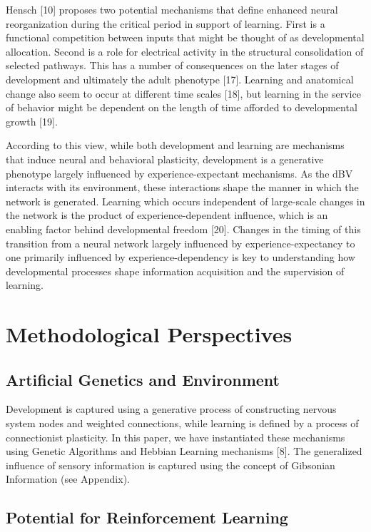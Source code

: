 \documentclass{article}
\begin{document}
Hensch [10] proposes two potential mechanisms that define enhanced neural reorganization during the critical period in support of learning. First is a functional competition between inputs that might be thought of as developmental allocation. Second is a role for electrical activity in the structural consolidation of selected pathways. This has a number of consequences on the later stages of development and ultimately the adult phenotype [17]. Learning and anatomical change also seem to occur at different time scales [18], but learning in the service of behavior might be dependent on the length of time afforded to developmental growth [19].

According to this view, while both development and learning are mechanisms that induce neural and behavioral plasticity, development is a generative phenotype largely influenced by experience-expectant mechanisms. As the dBV interacts with its environment, these interactions shape the manner in which the network is generated. Learning which occurs independent of large-scale changes in the network is the product of experience-dependent influence, which is an enabling factor behind developmental freedom [20]. Changes in the timing of this transition from a neural network largely influenced by experience-expectancy to one primarily influenced by experience-dependency is key to understanding how developmental processes shape information acquisition and the supervision of learning. 

\section{Methodological Perspectives}

\subsection{Artificial Genetics and Environment}

Development is captured using a generative process of constructing nervous system nodes and weighted connections, while learning is defined by a process of connectionist plasticity. In this paper, we have instantiated these mechanisms using Genetic Algorithms and Hebbian Learning mechanisms [8]. The generalized influence of sensory information is captured using the concept of Gibsonian Information (see Appendix). 

\subsection{Potential for Reinforcement Learning}
\end{document}
